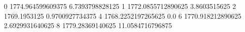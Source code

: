 0 1774.964599609375 6.7393798828125
1 1772.0855712890625 3.8603515625
2 1769.1953125 0.9700927734375
4 1768.2252197265625 0.0
6 1770.918212890625 2.6929931640625
8 1779.28369140625 11.0584716796875
